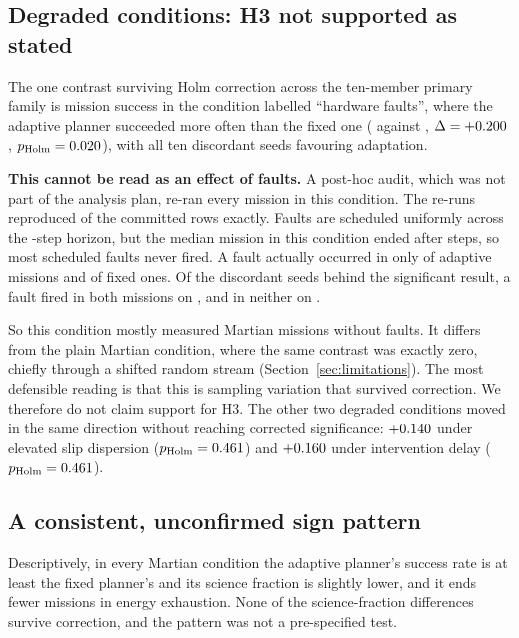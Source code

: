 \documentclass[11pt]{article}
\begin{document}
\subsection{Degraded conditions: H3 not supported as stated}

The one contrast surviving Holm correction across the ten-member primary family
is mission success in the condition labelled ``hardware faults'', where the
adaptive planner succeeded more often than the fixed one
(\MainMarsFaultAdaptiveSuccess{} against \MainMarsFaultFixedSuccess{},
$\Delta = +0.200$,
$p_{\mathrm{Holm}} = 0.020$), with all ten discordant seeds
favouring adaptation.

\textbf{This cannot be read as an effect of faults.} A post-hoc audit, which
was not part of the analysis plan, re-ran every mission in this condition. The
re-runs reproduced \AuditReproduced{} of the committed rows exactly. Faults are
scheduled uniformly across the \AuditHorizon-step horizon, but the median
mission in this condition ended after \AuditMedianSteps{} steps, so most
scheduled faults never fired. A fault actually occurred in only
\AuditFiredAdaptive{} of adaptive missions and \AuditFiredFixed{} of fixed
ones. Of the \AuditDiscordant{} discordant seeds behind the significant result,
a fault fired in both missions on \AuditDiscordantBoth{}, and in neither on
\AuditDiscordantNone{}.

So this condition mostly measured Martian missions without faults. It differs
from the plain Martian condition, where the same contrast was exactly zero,
chiefly through a shifted random stream (Section~\ref{sec:limitations}). The
most defensible reading is that this is sampling variation that survived
correction. We therefore do not claim support for H3. The other two degraded
conditions moved in the same direction without reaching corrected
significance: $+0.140$ under elevated slip dispersion
($p_{\mathrm{Holm}} = 0.461$) and $+0.160$
under intervention delay ($p_{\mathrm{Holm}} = 0.461$).

\subsection{A consistent, unconfirmed sign pattern}

Descriptively, in every Martian condition the adaptive planner's success rate is
at least the fixed planner's and its science fraction is slightly lower, and it
ends fewer missions in energy exhaustion. None of the science-fraction
differences survive correction, and the pattern was not a pre-specified test.
\end{document}
